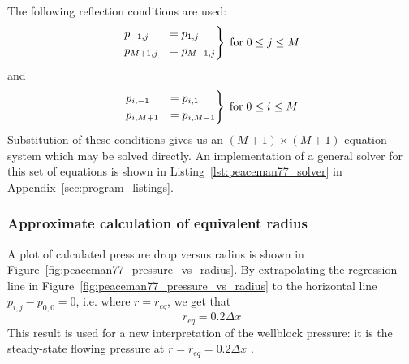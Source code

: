 The following reflection conditions are used:
\begin{equation}
    \begin{rcases}
        p_{-1,j} &= p_{1,j} \\
        p_{M+1,j} &= p_{M-1,j}
    \end{rcases} \; \mathrm{for} \; 0\leq j \leq M
\end{equation}
and
\begin{equation}
    \begin{rcases}
        p_{i,-1} &= p_{i,1} \\
        p_{i,M+1} &= p_{i,M-1}
    \end{rcases} \; \mathrm{for} \; 0\leq i \leq M
\end{equation}
Substitution of these conditions gives us an $(M+1)\times (M+1)$ equation system which may be solved directly. An implementation of a general solver for this set of equations is shown in Listing~\ref{lst:peaceman77_solver} in Appendix~\ref{sec:program_listings}.


\subsubsection{Approximate calculation of equivalent radius} %
\label{ssub:approximate_calculation_of_equivalent_radius}
A plot of calculated pressure drop versus radius is shown in Figure~\ref{fig:peaceman77_pressure_vs_radius}. By extrapolating  the regression line in Figure~\ref{fig:peaceman77_pressure_vs_radius} to the horizontal line $p_{i,j}-p_{0,0}=0$, i.e. where $r=r_{eq}$, we get that
\begin{equation}
    r_{eq} = 0.2 \Delta x
\end{equation}
This result is used for a new interpretation of the wellblock pressure: it is the steady-state flowing pressure at $r=r_{eq}=0.2 \Delta x$ \cite{Peaceman1978Interpretation}.

